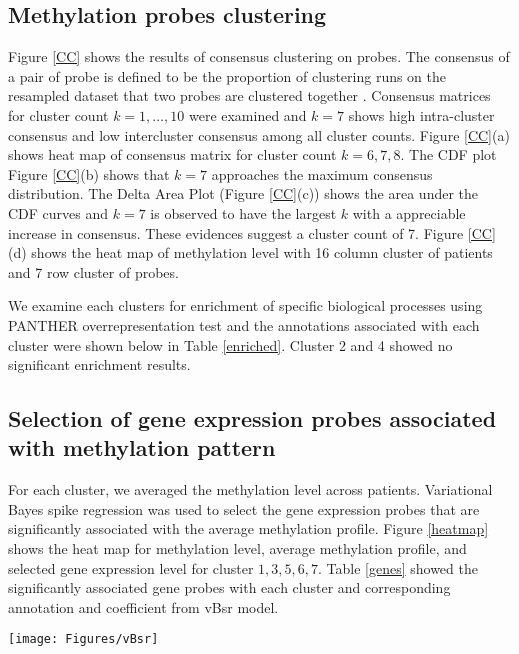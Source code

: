 \documentclass{article}
\begin{document}
\subsection{Methylation probes clustering}

Figure \ref{CC} shows the results of consensus clustering on probes. The consensus of a pair of probe is defined to be the proportion of clustering runs on the resampled dataset that two probes are clustered together \citep{monti2003consensus}. Consensus matrices for cluster count $k = 1, \dots, 10$ were examined and $k = 7$ shows high intra-cluster consensus and low intercluster consensus among all cluster counts. Figure \ref{CC}(a) shows heat map of consensus matrix for cluster count $k = 6, 7, 8$. The CDF plot Figure \ref{CC}(b) shows that $k = 7$ approaches the maximum consensus distribution. The Delta Area Plot (Figure \ref{CC}(c)) shows the area under the CDF curves and $k = 7$ is observed to have the largest $k$ with a appreciable increase in consensus. These evidences suggest a cluster count of 7. Figure \ref{CC}(d) shows the heat map of methylation level with 16 column cluster of patients and 7 row cluster of probes. 

We examine each clusters for enrichment of specific biological processes using PANTHER overrepresentation test \citep{mi2013large} and the annotations associated with each cluster were shown below in Table \ref{enriched}. Cluster 2 and 4 showed no significant enrichment results. 

\subsection{Selection of gene expression probes associated with methylation pattern}

For each cluster, we averaged the methylation level across patients. Variational Bayes spike regression was used to select the gene expression probes that are significantly associated with the average methylation profile. Figure \ref{heatmap} shows the heat map for methylation level, average methylation profile, and selected gene expression level for cluster $1, 3, 5, 6, 7$. Table \ref{genes} showed the significantly associated gene probes with each cluster and corresponding annotation and coefficient from vBsr model. 

\begin{figure*}[htb!]
\centering
\texttt{[image: Figures/vBsr]}
\caption{\textbf{Heat map of methylation level, average methylation level and gene expression probes significantly associate with average methylation level} For methylation cluster 1, 3, 5, 6, 7, the methylation level is shown. Methylation level within a cluster is averaged across the patients and served as response variable for vBsr model. The gene expression level of probes significantly associated with the methylation level was standardized and displayed as heat map as well. }
\label{heatmap}
\end{figure*}
\end{document}
